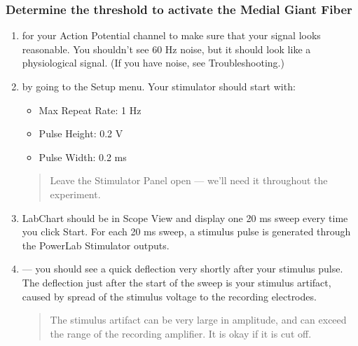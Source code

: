 \documentclass[letterpaper,10pt,english]{jupyterBook}
\begin{document}
\subsubsection{Determine the threshold to activate the Medial Giant Fiber}
\label{\detokenize{Earthworm:determine-the-threshold-to-activate-the-medial-giant-fiber}}\begin{enumerate}
%
\item {} 
\sphinxAtStartPar
{} for your Action Potential channel to make sure that your signal looks reasonable. You shouldn’t see 60 Hz noise, but it should look like a physiological signal. (If you have noise, see Troubleshooting.)

\item {} 
\sphinxAtStartPar
{} by going to the Setup menu. Your stimulator should start with:
\begin{itemize}
\item {} 
\sphinxAtStartPar
Max Repeat Rate: 1 Hz

\item {} 
\sphinxAtStartPar
Pulse Height: 0.2 V

\item {} 
\sphinxAtStartPar
Pulse Width: 0.2 ms

\end{itemize}
\begin{quote}

\sphinxAtStartPar
{} Leave the Stimulator Panel open — we’ll need it throughout the experiment.
\end{quote}

\item {} 
\sphinxAtStartPar
{} LabChart should be in Scope View and display one 20 ms sweep every time you click Start. For each 20 ms sweep, a stimulus pulse is generated through the PowerLab Stimulator outputs.

\item {} 
\sphinxAtStartPar
{} — you should see a quick deflection very shortly after your stimulus pulse. The deflection just after the start of the sweep is your stimulus artifact, caused by spread of the stimulus voltage to the recording electrodes.
\begin{quote}

\sphinxAtStartPar
{} The stimulus artifact can be very large in amplitude, and can exceed the range of the recording amplifier. It is okay if it is cut off.
\end{quote}


\end{enumerate}
\end{document}
